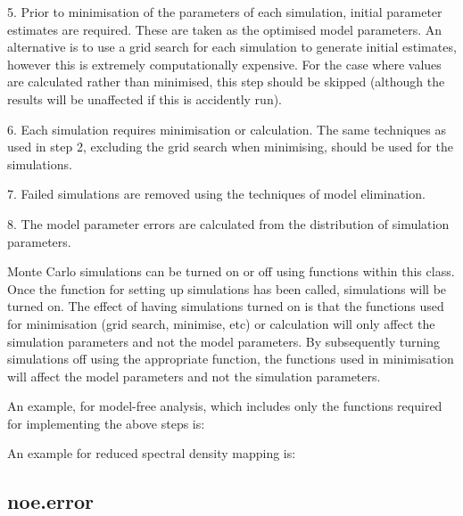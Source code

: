 5.  Prior to minimisation of the parameters of each simulation, initial parameter estimates
are required.  These are taken as the optimised model parameters.  An alternative is to use
a grid search for each simulation to generate initial estimates, however this is extremely
computationally expensive.  For the case where values are calculated rather than minimised,
this step should be skipped (although the results will be unaffected if this is accidently
run).

6.  Each simulation requires minimisation or calculation.  The same techniques as used in
step 2, excluding the grid search when minimising, should be used for the simulations.

7.  Failed simulations are removed using the techniques of model elimination.

8.  The model parameter errors are calculated from the distribution of simulation
parameters.


Monte Carlo simulations can be turned on or off using functions within this class.  Once the
function for setting up simulations has been called, simulations will be turned on.  The
effect of having simulations turned on is that the functions used for minimisation (grid
search, minimise, etc) or calculation will only affect the simulation parameters and not the
model parameters.  By subsequently turning simulations off using the appropriate function,
the functions used in minimisation will affect the model parameters and not the simulation
parameters.


An example, for model-free analysis, which includes only the functions required for
implementing the above steps is:




An example for reduced spectral density mapping is:





\newpage

\subsection{noe.error}


